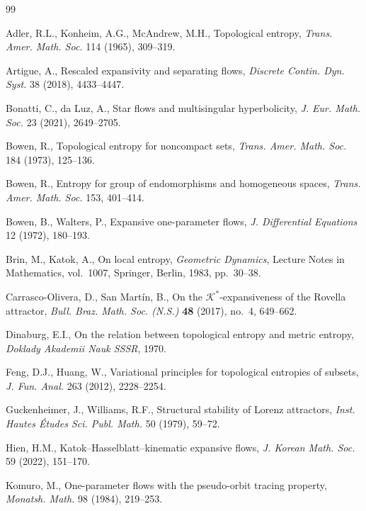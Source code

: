 \documentclass[11pt,reqno]{amsart}
\theoremstyle{definition}
\theoremstyle{remark}
\begin{document}
\begin{thebibliography}{99}

Adler, R.L., Konheim, A.G., McAndrew, M.H.,
Topological entropy,
\emph{Trans. Amer. Math. Soc.} 114 (1965), 309--319.




Artigue, A.,
Rescaled expansivity and separating flows,
\emph{Discrete Contin. Dyn. Syst.} 38 (2018), 4433--4447.

Bonatti, C., da Luz, A.,
Star flows and multisingular hyperbolicity,
\emph{J. Eur. Math. Soc.} 23 (2021), 2649--2705.


Bowen, R.,
Topological entropy for noncompact sets,
\emph{Trans. Amer. Math. Soc.} 184 (1973), 125--136.

Bowen, R.,
Entropy for group of endomorphisms and homogeneous spaces,
\emph{Trans. Amer. Math. Soc.} 153, 401--414.

Bowen, B., Walters, P.,
Expansive one-parameter flows,
\emph{J. Differential Equations} 12 (1972), 180--193.

Brin, M., Katok, A.,
On local entropy,
\emph{Geometric Dynamics}, Lecture Notes in Mathematics, vol.~1007, Springer, Berlin, 1983, pp.~30--38.













Carrasco-Olivera, D., San Mart\'{i}n, B.,
On the $\mathcal K^*$-expansiveness of the Rovella attractor,
\emph{Bull. Braz. Math. Soc. (N.S.)} \textbf{48} (2017), no.~4,
649--662.


Dinaburg, E.I.,
On the relation between topological entropy and metric entropy,
\textit{Doklady Akademii Nauk SSSR}, 1970.

Feng, D.J., Huang, W.,
Variational principles for topological entropies of subsets,
\emph{J. Fun. Anal.} 263 (2012), 2228--2254.


Guckenheimer, J., Williams, R.F.,
Structural stability of Lorenz attractors,
\emph{Inst. Hautes \'Etudes Sci. Publ. Math.} 50 (1979), 59--72.

Hien, H.M.,
Katok--Hasselblatt--kinematic expansive flows,
\emph{J. Korean Math. Soc.} 59 (2022), 151--170.


Komuro, M.,
One-parameter flows with the pseudo-orbit tracing property,
\emph{Monatsh. Math.} 98 (1984), 219--253.


\end{thebibliography}
\end{document}
